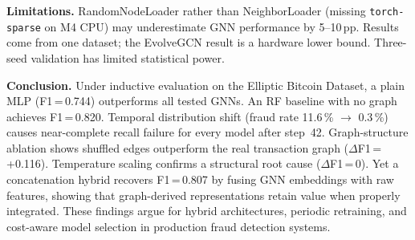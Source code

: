 \documentclass[journal,10pt,twoside]{IEEEtran}
\begin{document}
\textbf{Limitations.} RandomNodeLoader rather than NeighborLoader
(missing \texttt{torch-sparse} on M4 CPU) may underestimate GNN
performance by 5--10\,pp. Results come from one dataset; the
EvolveGCN result is a hardware lower bound. Three-seed validation
has limited statistical power.

\textbf{Conclusion.} Under inductive evaluation on the Elliptic
Bitcoin Dataset, a plain MLP (F1\,=\,0.744) outperforms all tested
GNNs. An RF baseline with no graph achieves F1\,=\,0.820. Temporal
distribution shift (fraud rate 11.6\,\% $\to$ 0.3\,\%) causes
near-complete recall failure for every model after step~42.
Graph-structure ablation shows shuffled edges outperform the real
transaction graph ($\Delta$F1\,=\,+0.116). Temperature scaling
confirms a structural root cause ($\Delta$F1\,=\,0). Yet a
concatenation hybrid recovers F1\,=\,0.807 by fusing GNN embeddings
with raw features, showing that graph-derived representations retain
value when properly integrated. These findings argue for hybrid
architectures, periodic retraining, and cost-aware model selection
in production fraud detection systems.



\end{document}
